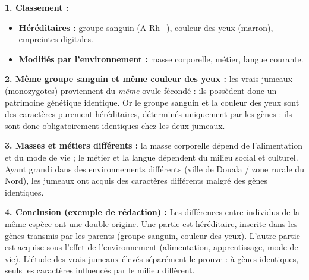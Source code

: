 \documentclass[11pt]{article}
\newcommand{\cle}[1]{{\popxbold\color{popdark}#1}}
\begin{document}
\begin{corrige}
\textbf{1. Classement :}
\begin{itemize}
    \item \textbf{Héréditaires :} groupe sanguin (A Rh+), couleur des yeux (marron), empreintes digitales.
    \item \textbf{Modifiés par l'environnement :} masse corporelle, métier, langue courante.
\end{itemize}

\textbf{2. Même groupe sanguin et même couleur des yeux :} les vrais jumeaux (monozygotes) proviennent du \emph{même} ovule fécondé : ils possèdent donc un \cle{patrimoine génétique identique}. Or le groupe sanguin et la couleur des yeux sont des caractères purement héréditaires, déterminés uniquement par les gènes : ils sont donc obligatoirement identiques chez les deux jumeaux.

\textbf{3. Masses et métiers différents :} la masse corporelle dépend de l'alimentation et du mode de vie ; le métier et la langue dépendent du milieu social et culturel. Ayant grandi dans des environnements différents (ville de Douala / zone rurale du Nord), les jumeaux ont acquis des caractères différents malgré des gènes identiques.

\textbf{4. Conclusion (exemple de rédaction) :} Les différences entre individus de la même espèce ont une double origine. Une partie est héréditaire, inscrite dans les gènes transmis par les parents (groupe sanguin, couleur des yeux). L'autre partie est acquise sous l'effet de l'environnement (alimentation, apprentissage, mode de vie). L'étude des vrais jumeaux élevés séparément le prouve : à gènes identiques, seuls les caractères influencés par le milieu diffèrent.
\end{corrige}
\end{document}
